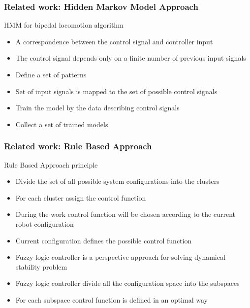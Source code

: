 \documentclass{beamer}
\begin{document}

	\begin{frame}
		\frametitle{Related work: Hidden Markov Model Approach}
		\begin{block}{HMM for bipedal locomotion algorithm}
			\begin{itemize}
				\item
					A correspondence between the control signal and controller input
				\item 
					 The control signal depends only on a finite number of previous input signals
				\item
					Define a set of patterns
				\item
					Set of input signals is mapped to the set of possible control signals
				\item
					Train the model by the data describing control signals
				\item
					 Collect a set of trained models
			\end{itemize}
		\end{block}
	\end{frame}
	

	\begin{frame}
		\frametitle{Related work: Rule Based Approach}
		\begin{block}{Rule Based Approach principle}
			\begin{itemize}
				\item
					Divide the set of all possible system configurations into the clusters
				\item 
					For each cluster assign the control function
				\item During the work control function will be chosen according to the current robot configuration
				\item
					Current configuration defines the possible control function
				\item Fuzzy logic controller is a perspective approach for solving dynamical stability problem
				\item Fuzzy logic controller divide all the configuration space into the subspaces
				\item For each subspace control function is defined in an optimal way
			\end{itemize}
		\end{block}
	\end{frame}
\end{document}
